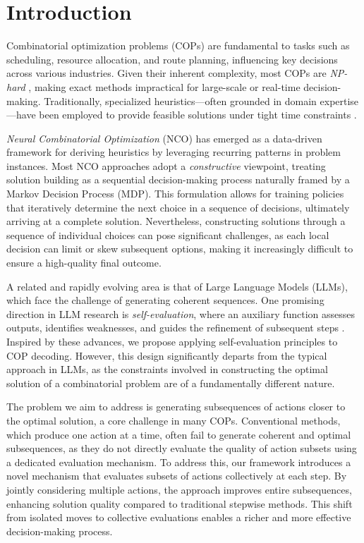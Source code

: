 \section{Introduction}

Combinatorial optimization problems (COPs) are fundamental to tasks such as scheduling, resource allocation, and route planning, influencing key decisions across various industries. Given their inherent complexity, most COPs are \emph{NP-hard} \cite{papadimitriou1998}, making exact methods impractical for large-scale or real-time decision-making. Traditionally, specialized heuristics—often grounded in domain expertise—have been employed to provide feasible solutions under tight time constraints \cite{blum2003metaheuristics}.

\emph{Neural Combinatorial Optimization} (NCO) \cite{vinyals2015pointer, bello2017neural} has emerged as a data-driven framework for deriving heuristics by leveraging recurring patterns in problem instances. Most NCO approaches adopt a \emph{constructive} viewpoint, treating solution building as a sequential decision-making process naturally framed by a Markov Decision Process (MDP). This formulation allows for training policies that iteratively determine the next choice in a sequence of decisions, ultimately arriving at a complete solution. Nevertheless, constructing solutions through a sequence of individual choices can pose significant challenges, as each local decision can limit or skew subsequent options, making it increasingly difficult to ensure a high-quality final outcome.

A related and rapidly evolving area is that of Large Language Models (LLMs), which face the challenge of generating coherent sequences. One promising direction in LLM research is \emph{self-evaluation}, where an auxiliary function assesses outputs, identifies weaknesses, and guides the refinement of subsequent steps \cite{kadavath2022,xie2024self}. Inspired by these advances, we propose applying self-evaluation principles to COP decoding. However, this design significantly departs from the typical approach in LLMs, as the constraints involved in constructing the optimal solution of a combinatorial problem are of a fundamentally different nature.

The problem we aim to address is generating subsequences of actions closer to the optimal solution, a core challenge in many COPs. Conventional methods, which produce one action at a time, often fail to generate coherent and optimal subsequences, as they do not directly evaluate the quality of action subsets using a dedicated evaluation mechanism. To address this, our framework introduces a novel mechanism that evaluates subsets of actions collectively at each step. By jointly considering multiple actions, the approach improves entire subsequences, enhancing solution quality compared to traditional stepwise methods. This shift from isolated moves to collective evaluations enables a richer and more effective decision-making process.


